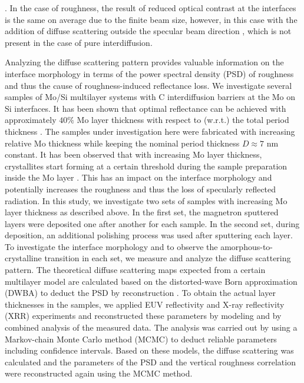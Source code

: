 \cite{braun_grenzflachen-optimierte_2003,braun_mo/si_2002}. In the case of roughness, the result of reduced optical contrast at the interfaces is the same on average due to the finite beam size, however, in this case with the addition of diffuse scattering outside the specular beam direction \cite{sinha_x-ray_1994}, which is not present in the case of pure interdiffusion.

Analyzing the diffuse scattering pattern provides valuable information on the interface morphology in terms of the power spectral density (PSD) of roughness and thus the cause of roughness-induced reflectance loss. We investigate several samples of Mo/Si multilayer systems with C interdiffusion barriers at the Mo on Si interfaces. It has been shown that optimal reflectance can be achieved with approximately $40 \%$ Mo layer thickness with respect to (w.r.t.) the total period thickness \cite{bajt_investigation_2001,braun_mo/si_2002}. The samples under investigation here were fabricated with increasing relative Mo thickness while keeping the nominal period thickness $D\approx 7$ nm constant. It has been observed that with increasing Mo layer thickness, crystallites start forming at a certain threshold during the sample preparation inside the Mo layer \cite{bajt_investigation_2001}. This has an impact on the interface morphology and potentially increases the roughness and thus the loss of specularly reflected radiation. In this study, we investigate two sets of samples with increasing Mo layer thickness as described above. In the first set, the magnetron sputtered layers were deposited one after another for each sample. In the second set, during deposition, an additional polishing process was used after sputtering each layer. To investigate the interface morphology and to observe the amorphous-to-crystalline transition in each set, we measure and analyze the diffuse scattering pattern. The theoretical diffuse scattering maps expected from a certain multilayer model are calculated based on the distorted-wave Born approximation (DWBA) to deduct the PSD by reconstruction \cite{holy_nonspecular_1994,holy_x-ray_1993,haase_role_2014}. To obtain the actual layer thicknesses in the samples, we applied EUV reflectivity and X-ray reflectivity (XRR) experiments and reconstructed these parameters by modeling and by combined analysis of the measured data. The analysis was carried out by using a Markov-chain Monte Carlo method (MCMC) \cite{foreman-mackey_emcee:_2013} to deduct reliable parameters including confidence intervals. Based on these models, the diffuse scattering was calculated and the parameters of the PSD and the vertical roughness correlation were reconstructed again using the MCMC method.

